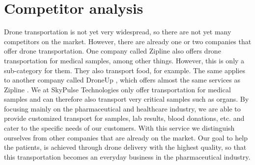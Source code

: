 \chapter{Competitor analysis}
Drone transportation is not yet very widespread, so there are not yet many competitors on the market. However, there are already one or two companies that offer drone transportation. One company called Zipline \cite{zipline_24} also offers drone transportation for medical samples, among other things. However, this is only a sub-category for them. They also transport food, for example. The same applies to another company called DroneUp \cite{droneup}, which offers almost the same services as Zipline \cite{zipline_24}. We at SkyPulse Technologies only offer transportation for medical samples and can therefore also transport very critical samples such as organs. By focusing mainly on the pharmaceutical and healthcare industry, we are able to provide customized transport for samples, lab results, blood donations, etc. and cater to the specific needs of our customers. With this service we distinguish ourselves from other companies that are already on the market. Our goal to help the patients, is achieved through drone delivery with the highest quality, so that this transportation becomes an everyday business in the pharmaceutical industry.
